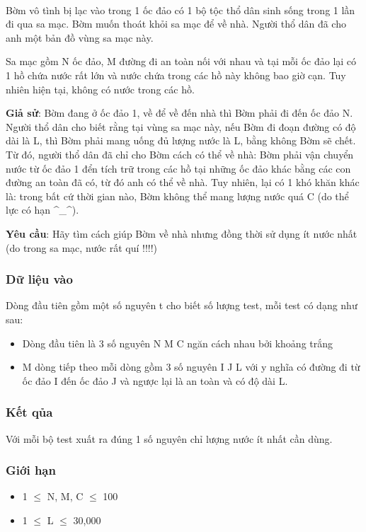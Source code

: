 

 

Bờm vô tình bị lạc vào trong 1 ốc đảo có 1 bộ tộc thổ dân sinh sống trong 1 lần đi qua sa mạc. Bờm muốn thoát khỏi sa mạc để về nhà. Người thổ dân đã cho anh một bản đồ vùng sa mạc này.

Sa mạc gồm N ốc đảo, M đường đi an toàn nối với nhau và tại mỗi ốc đảo lại có 1 hồ chứa nước rất lớn và nước chứa trong các hồ này không bao giờ cạn. Tuy nhiên hiện tại, không có nước trong các hồ.

\textbf{Giả sử}: Bờm đang ở ốc đảo 1, về để về đến nhà thì Bờm phải đi đến ốc đảo N. Người thổ dân cho biết rằng tại vùng sa mạc này, nếu Bờm đi đoạn đường có độ dài là L, thì Bờm phải mang uống đủ lượng nước là L, bằng không Bờm sẽ chết. Từ đó, người thổ dân đã chỉ cho Bờm cách có thể về nhà: Bờm phải vận chuyển nước từ ốc đảo 1 đển tích trữ trong các hồ tại những ốc đảo khác bằng các con đường an toàn đã có, từ đó anh có thể về nhà. Tuy nhiên, lại có 1 khó khăn khác là: trong bất cứ thời gian nào, Bờm không thể mang lượng nước quá C (do thể lực có hạn ^\_^).

\textbf{Yêu cầu}: Hãy tìm cách giúp Bờm về nhà nhưng đồng thời sử dụng ít nước nhất (do trong sa mạc, nước rất quí !!!!)

\subsubsection{Dữ liệu vào}

Dòng đầu tiên gồm một số nguyên t cho biết số lượng test, mỗi test có dạng như sau:
\begin{itemize}
	\item Dòng đầu tiên là 3 số nguyên N M C ngăn cách nhau bởi khoảng trắng
	\item M dòng tiếp theo mỗi dòng gồm 3 số nguyên I J L với y nghĩa có đường đi từ ốc đảo I đến ốc đảo J và ngược lại là an toàn và có độ dài L.
\end{itemize}

\subsubsection{Kết qủa}

Với mỗi bộ test xuất ra đúng 1 số nguyên chỉ lượng nước ít nhất cần dùng.

\subsubsection{Giới hạn}
\begin{itemize}
	\item 1  $\le$  N, M, C  $\le$  100
	\item 1  $\le$  L  $\le$  30,000
\end{itemize}

